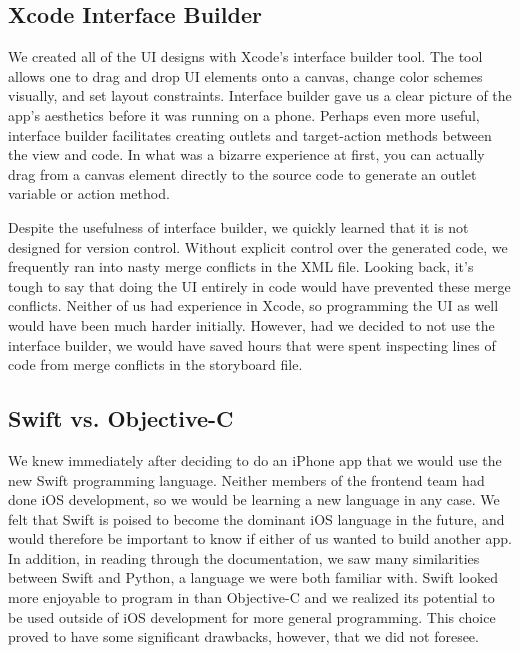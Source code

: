 \documentclass[12pt]{article}
\begin{document}
\subsection{Xcode Interface Builder}

We created all of the UI designs with Xcode's interface builder tool. The tool allows one to drag and drop UI elements onto a canvas, change color schemes visually, and set layout constraints. Interface builder gave us a clear picture of the app's aesthetics before it was running on a phone. Perhaps even more useful, interface builder facilitates creating outlets and target-action methods between the view and code. In what was a bizarre experience at first, you can actually drag from a canvas element directly to the source code to generate an outlet variable or action method. 

\bigskip

Despite the usefulness of interface builder, we quickly learned that it is not designed for version control. Without explicit control over the generated code, we frequently ran into nasty merge conflicts in the XML file. Looking back, it's tough to say that doing the UI entirely in code would have prevented these merge conflicts. Neither of us had experience in Xcode, so programming the UI as well would have been much harder initially. However, had we decided to not use the interface builder, we would have saved hours that were spent inspecting lines of code from merge conflicts in the storyboard file. 

\bigskip

\subsection{Swift vs. Objective-C}
We knew immediately after deciding to do an iPhone app that we would use the new Swift programming language. Neither members of the frontend team had done iOS development, so we would be learning a new language in any case. We felt that Swift is poised to become the dominant iOS language in the future, and would therefore be important to know if either of us wanted to build another app. In addition, in reading through the documentation, we saw many similarities between Swift and Python, a language we were both familiar with. Swift looked more enjoyable to program in than Objective-C and we realized its potential to be used outside of iOS development for more general programming. This choice proved to have some significant drawbacks, however, that we did not foresee. 
\end{document}

